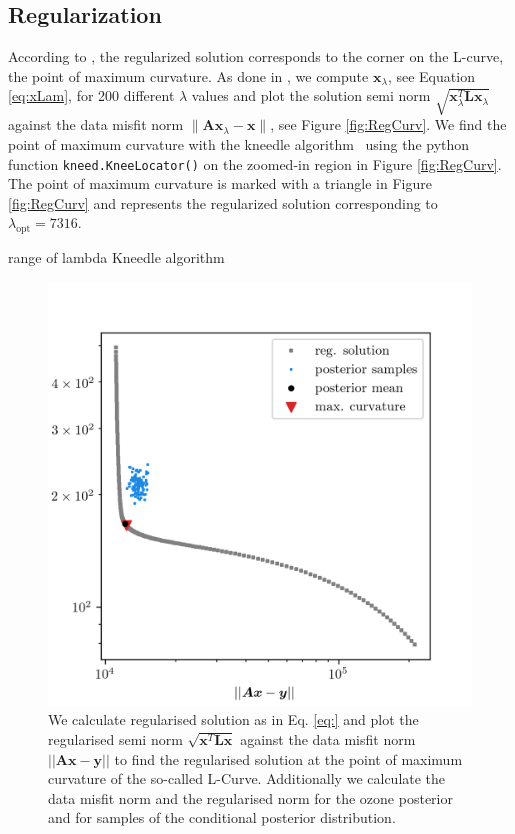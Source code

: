 \subsection{Regularization}
\label{sec:reg}
According to \cite{hansen1993use}, the regularized solution corresponds to the corner on the L-curve, the point of maximum curvature.
As done in \cite{hansen1993use}, we compute $\bm{x}_\lambda$, see Equation \eqref{eq:xLam}, for 200 different $\lambda$ values and plot the solution semi norm $\sqrt{\bm{x}_\lambda^T\mathbf{L} \bm{x}_\lambda}$ against the data misfit norm $\lVert \bm{A}\bm{x}_\lambda - \bm{x} \rVert$, see Figure \ref{fig:RegCurv}.
We find the point of maximum curvature with the kneedle algorithm~\cite{satopaa2011kneedle} using the python function \texttt{kneed.KneeLocator()} on the zoomed-in region in Figure \ref{fig:RegCurv}.
The point of maximum curvature is marked with a triangle in Figure \ref{fig:RegCurv} and represents the regularized solution corresponding to $\lambda_{\text{opt}} = 7316$.



range of lambda
Kneedle algorithm
\begin{figure}[ht!]
	\centering
	\includegraphics{LCurvePhD.png}
	\caption[Plot of the L-curve to find the regularised solution.]{We calculate regularised solution as in Eq. \ref{eq:} and plot the regularised semi norm $\sqrt{\bm{x}^T\bm{Lx}}$ against the data misfit norm $||\bm{Ax} -\bm{y} ||$ to find the regularised solution at the point of maximum curvature of the so-called L-Curve. Additionally we calculate the data misfit norm and the regularised norm for the ozone posterior and for samples of the conditional posterior distribution.}
	\label{fig:LCurve}
\end{figure}



